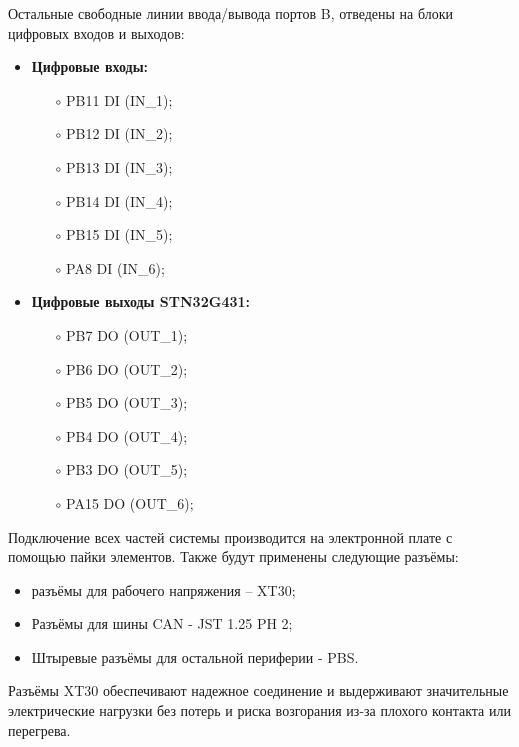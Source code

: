 Остальные свободные линии ввода/вывода портов B, отведены на блоки цифровых входов и выходов:
\begin{itemize}
	\item \textbf{Цифровые входы:}
	      \begin{itemize}
		      \item[$\circ$] PB11 \leftarrow DI (IN\_1);
		      \item[$\circ$] PB12 \leftarrow DI (IN\_2);
		      \item[$\circ$] PB13 \leftarrow DI (IN\_3);
		      \item[$\circ$] PB14 \leftarrow DI (IN\_4);
		      \item[$\circ$] PB15 \leftarrow DI (IN\_5);
		      \item[$\circ$] PA8 \leftarrow DI (IN\_6);
	      \end{itemize}
	\item \textbf{Цифровые выходы STN32G431:}
	      \begin{itemize}
		      \item[$\circ$] PB7 \rightarrow DO (OUT\_1);
		      \item[$\circ$] PB6 \rightarrow DO (OUT\_2);
		      \item[$\circ$] PB5 \rightarrow DO (OUT\_3);
		      \item[$\circ$] PB4 \rightarrow DO (OUT\_4);
		      \item[$\circ$] PB3 \rightarrow DO (OUT\_5);
		      \item[$\circ$] PA15 \rightarrow DO (OUT\_6);
	      \end{itemize}
\end{itemize}

Подключение всех частей системы производится на электронной плате с помощью пайки элементов. Также будут применены следующие разъёмы:
\begin{itemize}
	\item разъёмы для рабочего напряжения – XT30;
	\item Разъёмы для шины CAN - JST 1.25 PH 2;
	\item Штыревые разъёмы для остальной периферии - PBS.
\end{itemize}

Разъёмы XT30 обеспечивают надежное соединение и выдерживают значительные электрические нагрузки без потерь и риска возгорания из-за плохого контакта или перегрева.





